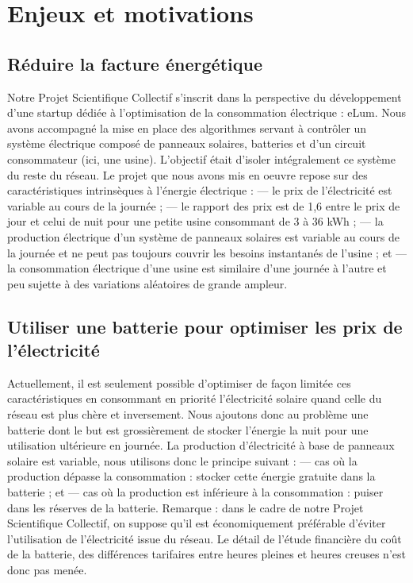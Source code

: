 \documentclass[a4paper]{article}
\begin{document}
\section{Enjeux et motivations}
\begin{multicols}{2}
\subsection{Réduire la facture énergétique}
Notre Projet Scientifique Collectif s’inscrit dans la perspective du développement d’une startup dédiée à l’optimisation de la consommation électrique : eLum. Nous avons accompagné la mise en place des algorithmes servant à contrôler un système électrique composé de panneaux solaires, batteries et d’un circuit consommateur (ici, une usine). L’objectif était d’isoler intégralement ce système du reste du réseau.
Le projet que nous avons mis en oeuvre repose sur des caractéristiques intrinsèques à l’énergie électrique :
— le prix de l’électricité est variable au cours de la journée ;
— le rapport des prix est de 1,6 entre le prix de jour et celui de nuit pour une petite usine consommant de 3 à 36 kWh ;
— la production électrique d’un système de panneaux solaires est variable au cours de la journée et ne peut pas toujours couvrir les besoins instantanés de l’usine ; et
— la consommation électrique d’une usine est similaire d’une journée à l’autre et peu sujette à des variations aléatoires de grande ampleur.

\subsection{Utiliser une batterie pour optimiser les prix de l’électricité}
Actuellement, il est seulement possible d'optimiser de façon limitée ces caractéristiques en consommant en priorité l’électricité solaire quand celle du réseau est plus chère et inversement. Nous ajoutons donc au problème une batterie dont le but est grossièrement de stocker l’énergie la nuit pour une utilisation ultérieure en journée. La production d’électricité à base de panneaux solaire est variable, nous utilisons donc le principe suivant :
— cas où la production dépasse la consommation : stocker cette énergie gratuite dans la batterie ; et
— cas où la production est inférieure à la consommation : puiser dans les réserves de la batterie.
Remarque : dans le cadre de notre Projet Scientifique Collectif, on suppose qu’il est économiquement préférable d’éviter l’utilisation de l’électricité issue du réseau. Le détail de l’étude financière du coût de la batterie, des différences tarifaires entre heures pleines et heures creuses n’est donc pas menée.


\end{multicols}
\end{document}
